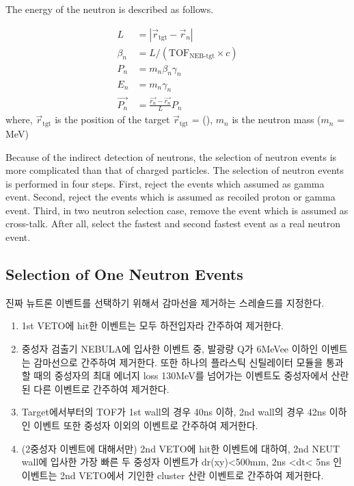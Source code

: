 The energy of the neutron is described as follows.

\begin{align}
    L &= | \vec{r}_{\text{tgt}} - \vec{r}_{n} | \\
    \beta_{n} &= L / (\text{TOF}_{\text{NEB-tgt}} \times c) \\
    P_{n} &= m_{n} \beta_{n} \gamma_{n} \\
    E_{n} &= m_{n} \gamma_{n} \\
    \vec{P_{n}} &= \frac{\vec{r_{n}} - \vec{r_{n}}}{L} P_{n}
\end{align}
where, $\vec{r}_{\text{tgt}}$ is the position of the target $\vec{r}_{\text{tgt}}$ = (), $m_{n}$ is the neutron mass ($m_n$ = MeV)

Because of the indirect detection of neutrons, the selection of neutron events is more complicated than that of charged particles. The selection of neutron events is performed in four steps. First, reject the events which assumed as gamma event. Second, reject the events which is assumed as recoiled proton or gamma event. Third, in two neutron selection case, remove the event which is assumed as cross-talk. After all, select the fastest and second fastest event as a real neutron event. 
\subsection{Selection of One Neutron Events}

진짜 뉴트론 이벤트를 선택하기 위해서 감마선을 제거하는 스레숄드를 지정한다.
\begin{enumerate}
    \item 1st VETO에 hit한 이벤트는 모두 하전입자라 간주하여 제거한다.
    \item 중성자 검출기 NEBULA에 입사한 이벤트 중, 발광량 Q가 6MeVee 이하인 이벤트는 감마선으로 간주하여 제거한다. 또한 하나의 플라스틱 신틸레이터 모듈을 통과할 때의 중성자의 최대 에너지 loss 130MeV를 넘어가는 이벤트도 중성자에서 산란된 다른 이벤트로 간주하여 제거한다.
    \item Target에서부터의 TOF가 1st wall의 경우 40ns 이하, 2nd wall의 경우 42ns 이하인 이벤트 또한 중성자 이외의 이벤트로 간주하여 제거한다.
    \item (2중성자 이벤트에 대해서만) 2nd VETO에 hit한 이벤트에 대하여, 2nd NEUT wall에 입사한 가장 빠른 두 중성자 이벤트가 dr(xy)<500mm, 2ns <dt< 5ns 인 이벤트는 2nd VETO에서 기인한 cluster 산란 이벤트로 간주하여 제거한다.
\end{enumerate}

